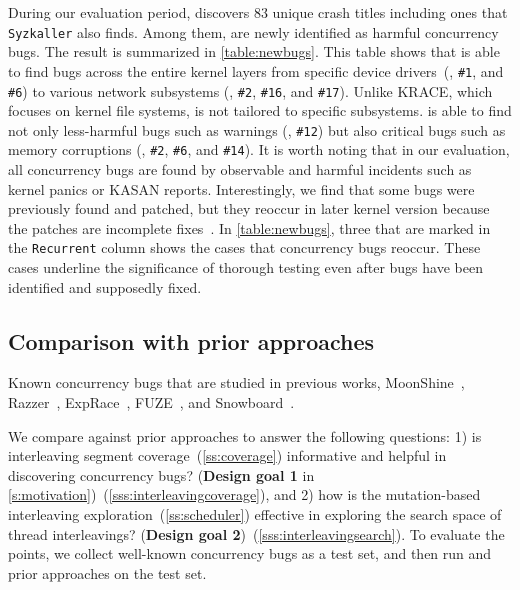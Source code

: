 %
During our evaluation period, \sys discovers 83 unique crash titles including
ones that \texttt{Syzkaller} also finds. Among them, \totalbugs are
newly identified as harmful concurrency bugs. The result is summarized in
\autoref{table:newbugs}.
%
This table shows that \sys is able to find bugs across the entire
kernel layers from specific device drivers~(\eg, \texttt{\#1}, and
\texttt{\#6}) to various network subsystems (\eg, \texttt{\#2},
\texttt{\#16}, and \texttt{\#17}). 
Unlike KRACE, which focuses on 
kernel file systems, \sys is not tailored to specific subsystems.
%
\sys is able to find not only less-harmful bugs such as warnings
(\eg, \texttt{\#12}) but also critical bugs such as memory corruptions
(\eg, \texttt{\#2}, \texttt{\#6}, and \texttt{\#14}).
%
It is worth noting that in our evaluation, all concurrency bugs are
found by observable and harmful incidents such as kernel panics or
KASAN reports.
%
Interestingly, we find that some bugs were previously found and
patched, but they reoccur in later kernel version because the patches are
incomplete fixes~\cite{learningfrommistakes}.
%
In \autoref{table:newbugs}, three that are marked in the
\texttt{Recurrent} column shows the cases that concurrency bugs reoccur.
%
These cases underline the significance of thorough testing even after 
bugs have been identified and supposedly fixed.

\subsection{Comparison with prior approaches}
\label{ss:comparison}

\begin{table}[t]
  
  \centering
  \caption{Known concurrency bugs that are studied in previous works,
    MoonShine~\cite{moonshine}, Razzer~\cite{razzer},
    ExpRace~\cite{exprace}, FUZE~\cite{fuze}, and
    Snowboard~\cite{snowboard}.}
  \label{table:knownbugs}
  \vspace{-5pt}
\end{table}

We compare \sys against prior approaches to answer the following
questions: 1) is interleaving segment
coverage~(\autoref{ss:coverage}) informative and helpful in
discovering concurrency bugs?  (\textbf{Design goal 1} in
\autoref{s:motivation})~(\autoref{sss:interleavingcoverage}), and
%
2) how is the mutation-based interleaving
exploration~(\autoref{ss:scheduler}) effective in exploring the search
space of thread interleavings? (\textbf{Design goal
  2})~(\autoref{sss:interleavingsearch}).
%
To evaluate the points, we collect well-known concurrency bugs as a test set, 
and then run \sys and prior approaches on the test set.

